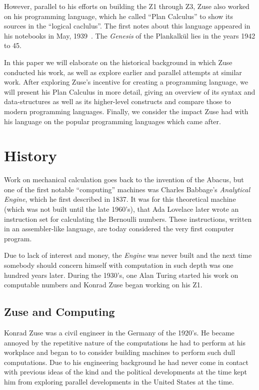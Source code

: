 \documentclass{llncs}
\begin{document}
   However, parallel to his efforts on building the Z1 through Z3, Zuse
   also worked on his programming language, which he called ``Plan Calculus''
   to show its sources in the ``logical caclulus''. The first notes about
   this language appeared in his notebooks in May, 1939~\cite{rojas2002konrad}. The \emph{Genesis}
   of the Plankalkül lies in the years 1942 to 45.

   In this paper we will elaborate on the historical background in which 
   Zuse conducted his work, as well as explore earlier and parallel attempts 
   at similar work. After exploring Zuse's incentive for creating a programming 
   language, we will present his Plan Calculus in more detail, giving an overview 
   of its syntax and data-structures as well as its higher-level constructs and compare 
   those to modern programming languages. Finally, we consider the impact Zuse
   had with his language on the popular programming languages which came after.
 \section{History}
   Work on mechanical calculation goes back to the invention of the Abacus, but one 
   of the first notable ``computing'' machines was Charles Babbage's \emph{Analytical Engine},
   which he first described in 1837. It was for this theoretical machine (which was not built until the 
   late 1960's), that Ada Lovelace later wrote an instruction set for calculating the Bernoulli numbers.
   These instructions, written in an assembler-like language, are today considered the very first computer program.

   Due to lack of interest and money, the \emph{Engine} was never built and the next 
   time somebody should concern himself with computation in such depth was 
   one hundred years later. During the 1930's, one Alan Turing started his work on computable numbers
   and Konrad Zuse began working on his Z1.
 \subsection{Zuse and Computing}
   Konrad Zuse was a civil engineer in the Germany of the 1920's. He became annoyed by
   the repetitive nature of the computations he had to perform at his workplace and began to 
   to consider building machines to perform such dull computations.
   Due to his engineering background he had never come in contact with previous 
   ideas of the kind and the political developments at the time kept him 
   from exploring parallel developments in the United States at the time.
\end{document}
